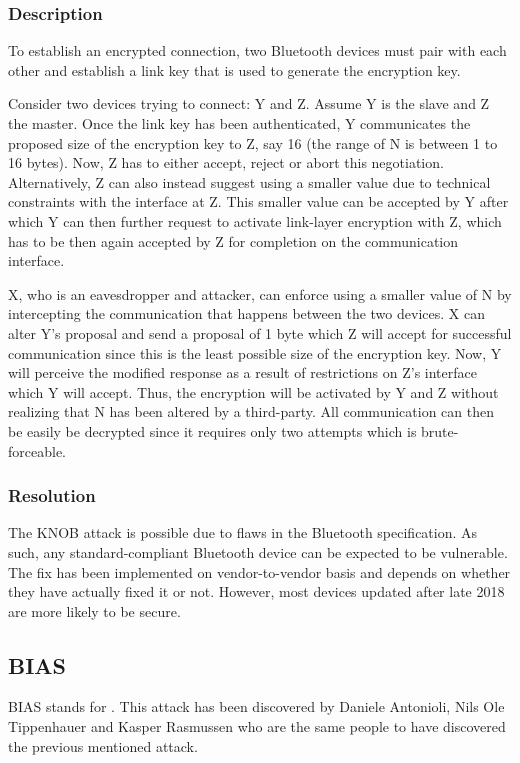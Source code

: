 \documentclass{article}
\begin{document}
\subsubsection{Description}
To establish an encrypted connection, two Bluetooth\texttrademark{} devices must pair with each other and establish a link key that is used to generate the encryption key.\par
Consider two devices trying to connect: Y and Z. Assume Y is the slave and Z the master. Once the link key has been authenticated, Y communicates the proposed size of the encryption key to Z, say 16 (the range of N is between 1 to 16 bytes). Now, Z has to either accept, reject or abort this negotiation. Alternatively, Z can also instead suggest using a smaller value due to technical constraints with the interface at Z. This smaller value can be accepted by Y after which Y can then further request to activate link-layer encryption with Z, which has to be then again accepted by Z for completion on the communication interface.\par
X, who is an eavesdropper and attacker, can enforce using a smaller value of N by intercepting the communication that happens between the two devices. X can alter Y's proposal and send a proposal of 1 byte which Z will accept for successful communication since this is the least possible size of the encryption key. Now, Y will perceive the modified response as a result of restrictions on Z's interface which Y will accept. Thus, the encryption will be activated by Y and Z without realizing that N has been altered by a third-party. All communication can then be easily be decrypted since it requires only two attempts which is brute-forceable.\cite{knobcve}
\subsubsection{Resolution}
The KNOB attack is possible due to flaws in the Bluetooth\texttrademark{} specification. As such, any standard-compliant Bluetooth\texttrademark{} device can be expected to be vulnerable. The fix has been implemented on vendor-to-vendor basis and depends on whether they have actually fixed it or not. However, most devices updated after late 2018 are more likely to be secure.\cite{knob}

\subsection{BIAS}
BIAS stands for . This attack has been discovered by Daniele Antonioli, Nils Ole Tippenhauer and Kasper Rasmussen who are the same people to have discovered the previous mentioned attack.\cite{bias}
\end{document}
